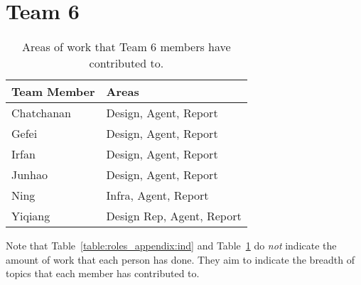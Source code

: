 \section{Team 6}
\label{sec:roles_appendix:team6}
\begin{table}[H]
    \centering
    \begin{tabular}{|l|l|}
    \hline
    \textbf{Team Member} & \textbf{Areas}       \\ \hline
    Chatchanan     & Design, Agent, Report             \\
    Gefei    & Design, Agent, Report        \\
    Irfan  & Design, Agent, Report         \\
    Junhao     & Design, Agent, Report           \\
    Ning  & Infra, Agent, Report           \\
    Yiqiang  & Design Rep, Agent, Report         \\\hline
    
\end{tabular}
\caption{Areas of work that Team 6 members have contributed to.}
\label{sec:roles_appendix:team1}
\end{table}


Note that Table~\ref{table:roles_appendix:ind} and Table~\ref{sec:roles_appendix:team1} do \emph{not} indicate the amount of work that each person has done. They aim to indicate the breadth of topics that each member has contributed to. 
